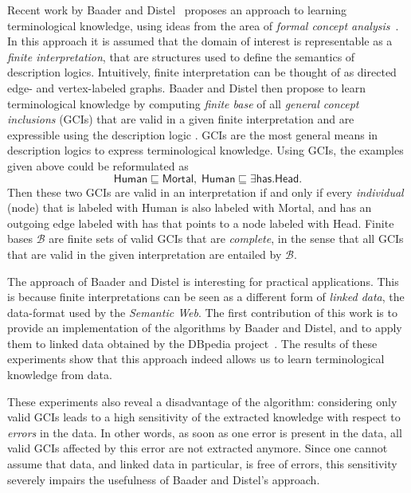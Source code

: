 \documentclass[english,fleqn]{scrartcl}
\begin{document}
Recent work by Baader and Distel~\cite{Diss-Felix} proposes an approach to learning
terminological knowledge, using ideas from the area of \emph{formal concept
  analysis}~\cite{fca-book}.  In this approach it is assumed that the domain of interest
is representable as a \emph{finite interpretation}, that are structures used to define the
semantics of description logics.  Intuitively, finite interpretation can be thought of as
directed edge- and vertex-labeled graphs.  Baader and Distel then propose to learn
terminological knowledge by computing \emph{finite base} of all \emph{general concept
  inclusions} (GCIs) that are valid in a given finite interpretation and are expressible
using the description logic \ELbot.  GCIs are the most general means in description logics
to express terminological knowledge.  Using GCIs, the examples given above could be
reformulated as
\begin{equation*}
  \mathsf{Human} \sqsubseteq \mathsf{Mortal}, \; \mathsf{Human} \sqsubseteq \exists
  \mathsf{has}. \mathsf{Head}.
\end{equation*}
Then these two GCIs are valid in an interpretation if and only if every \emph{individual}
(node) that is labeled with \textsf{Human} is also labeled with \textsf{Mortal}, and has
an outgoing edge labeled with \textsf{has} that points to a node labeled with
\textsf{Head}.  Finite bases $\mathcal{B}$ are finite sets of valid GCIs that are
\emph{complete}, in the sense that all GCIs that are valid in the given interpretation are
entailed by $\mathcal{B}$.

The approach of Baader and Distel is interesting for practical applications.  This is
because finite interpretations can be seen as a different form of \emph{linked data}, the
data-format used by the \emph{Semantic Web}.  The first contribution of this work is to
provide an implementation of the algorithms by Baader and Distel, and to apply them to
linked data obtained by the DBpedia project~\cite{DBpedia}.  The results of these
experiments show that this approach indeed allows us to learn terminological knowledge
from data.

These experiments also reveal a disadvantage of the algorithm: considering only valid GCIs
leads to a high sensitivity of the extracted knowledge with respect to \emph{errors} in
the data.  In other words, as soon as one error is present in the data, all valid GCIs
affected by this error are not extracted anymore.  Since one cannot assume that data, and
linked data in particular, is free of errors, this sensitivity severely impairs the
usefulness of Baader and Distel's approach.
\end{document}
